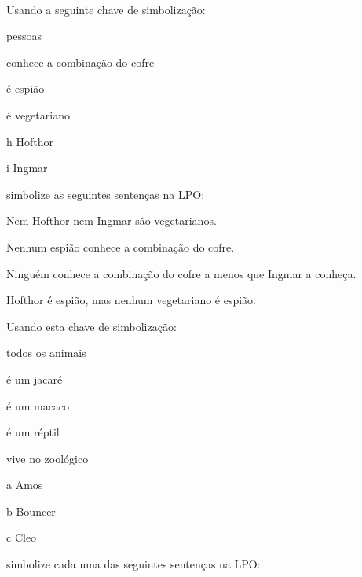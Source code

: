 \

\problempart
\label{pr.FOLvegetarians}
Usando a seguinte chave de simbolização:
\begin{ekey}
\item[\text{domínio}] pessoas
\item[\atom{K}{x}]  conhece a combinação do cofre
\item[\atom{S}{x}]  é espião
\item[\atom{V}{x}]  é vegetariano
\item[h] Hofthor
\item[i] Ingmar
\end{ekey}
simbolize as seguintes sentenças na LPO:
\begin{compactlist}
\item Nem Hofthor nem Ingmar são vegetarianos.
\item Nenhum espião conhece a combinação do cofre.
\item Ninguém conhece a combinação do cofre a menos que Ingmar a conheça.
\item Hofthor é espião, mas nenhum vegetariano é espião.
\end{compactlist}
\solutions
\problempart\label{pr.FOLalligators}
Usando esta chave de simbolização:
\begin{ekey}
\item[\text{domínio}] todos os animais
\item[\atom{A}{x}]  é um jacaré
\item[\atom{M}{x}]  é um macaco
\item[\atom{R}{x}]  é um réptil
\item[\atom{Z}{x}]  vive no zoológico
\item[a] Amos
\item[b] Bouncer
\item[c] Cleo
\end{ekey}
simbolize cada uma das seguintes sentenças na LPO:

